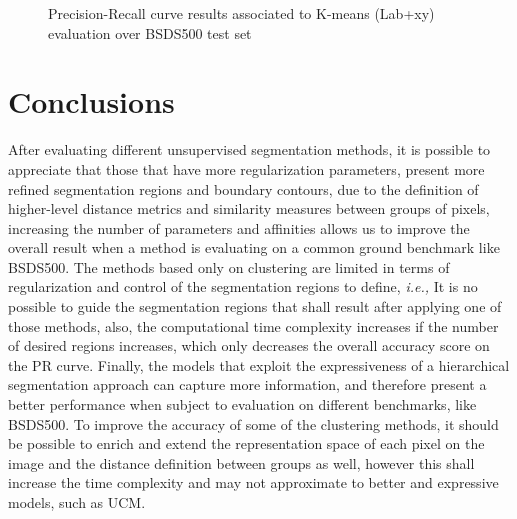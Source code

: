 \documentclass[10pt,twocolumn,letterpaper]{article}
\begin{document}
\begin{figure}[H]
	\centering
	\caption{Precision-Recall curve results associated to K-means (Lab+xy) evaluation over BSDS500 test set}
	\label{Fig:F2}
\end{figure}


\section{Conclusions}
After evaluating different unsupervised segmentation methods, it is possible to appreciate that those that have more regularization parameters, present more refined segmentation regions and boundary contours, due to the definition of higher-level distance metrics and similarity measures between groups of pixels, increasing the number of parameters and affinities allows us to improve the overall result when a method is evaluating on a common ground benchmark like BSDS500. The methods based only on clustering are limited in terms of regularization and control of the segmentation regions to define, \textit{i.e.,} It is no possible to guide the segmentation regions that shall result after applying one of those methods, also, the computational time complexity increases if the number of desired regions increases, which only decreases the overall accuracy score on the PR curve. Finally, the models that exploit the expressiveness of a hierarchical segmentation approach can capture more information, and therefore present a better performance when subject to evaluation on different benchmarks, like BSDS500. To improve the accuracy of some of the clustering methods, it should be possible to enrich and extend the representation space of each pixel on the image and the distance definition between groups as well, however this shall increase the time complexity and may not approximate to better and expressive models, such as UCM. 


{\small


}
\end{document}
